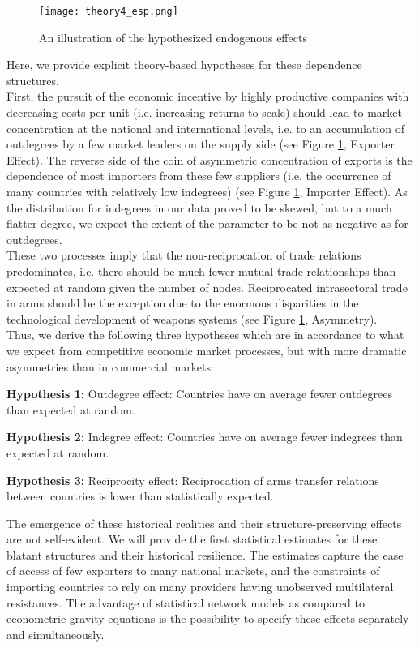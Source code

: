 \documentclass[12pt, letterpaper]{article}
\numberwithin{equation}{section}
\begin{document}
\begin{figure}
\centering
\texttt{[image: theory4\_esp.png]}
\caption{An illustration of the hypothesized endogenous effects}
\label{theory}
\end{figure}
Here, we provide explicit theory-based hypotheses for these dependence structures. \\
First, the pursuit of the economic incentive by highly productive companies with decreasing costs per unit (i.e. increasing returns to scale) should lead to market concentration at the national and international levels, i.e. to an accumulation of outdegrees by a few market leaders on the supply side (see Figure \ref{theory}, Exporter Effect). The reverse side of the coin of asymmetric concentration of exports is the dependence of most importers from these few suppliers (i.e. the occurrence of many countries with relatively low indegrees) (see Figure \ref{theory}, Importer Effect). As the distribution for indegrees in our data proved to be skewed, but to a much flatter degree, we expect the extent of the parameter to be not as negative as for outdegrees. \\
These two processes imply that the non-reciprocation of trade relations predominates, i.e. there should be much fewer mutual trade relationships than expected at random given the number of nodes. Reciprocated intrasectoral trade in arms should be the exception due to the enormous disparities in the technological development of weapons systems (see Figure \ref{theory}, Asymmetry). \\
Thus, we derive the following three hypotheses which are in accordance to what we expect from competitive economic market processes, but with more dramatic asymmetries than in commercial markets:
\vspace{-0.5cm}
\begin{itemize}
\begin{singlespace}
\item[] \textbf{Hypothesis 1:} Outdegree effect: Countries have on average fewer outdegrees than expected at random.
\item[] \textbf{Hypothesis 2:} Indegree effect: Countries have on average fewer indegrees than expected at random. 
\item[] \textbf{Hypothesis 3:} Reciprocity effect: Reciprocation of arms transfer relations between countries is lower than statistically expected.
\end{singlespace}
\end{itemize} 
The emergence of these historical realities and their structure-preserving effects are not self-evident. We will provide the first statistical estimates for these blatant structures and their historical resilience. The estimates capture the ease of access of few exporters to many national markets, and the constraints of importing countries to rely on many providers having unobserved multilateral resistances. The advantage of statistical network models as compared to econometric gravity equations is the possibility to specify these effects separately and simultaneously. \\
\end{document}
